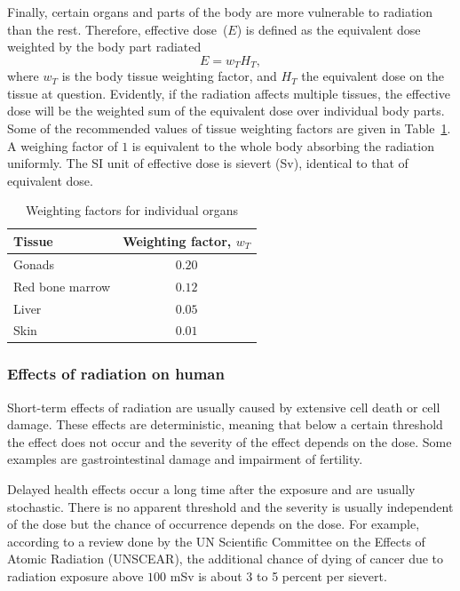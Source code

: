 \documentclass[nofootinbib,preprint,aps]{revtex4-1}
\begin{document}
        Finally, certain organs and parts of the body are more vulnerable to radiation than the rest.
        Therefore, effective dose~($E$) is defined as the equivalent dose weighted by the body part
        radiated
        \begin{equation}
            E = w_T H_T,
        \end{equation}
        where $w_T$ is the body tissue weighting factor, and $H_T$ the equivalent dose on the tissue
        at question.
        Evidently, if the radiation affects multiple tissues, the effective dose will be the weighted
        sum of the equivalent dose over individual body parts. Some of the recommended values of tissue
        weighting factors are given in Table~\ref{tab:eff}. A weighing factor of $1$ is equivalent to the
        whole body absorbing the radiation uniformly. The SI unit of effective dose is sievert (Sv),
        identical to that of equivalent dose.
        \begin{table}
            \centering
            \caption{Weighting factors for individual organs\cite{icrp74}}
            \begin{ruledtabular}
                \begin{tabular}{l c}
                Tissue & Weighting factor, $w_T$\\
                \hline
                Gonads & $0.20$\\
                Red bone marrow & $0.12$ \\
                Liver & $0.05$ \\
                Skin & $0.01$ \\
                \end{tabular}
                \label{tab:eff}
            \end{ruledtabular}
        \end{table}
        \subsubsection{Effects of radiation on human}
        Short-term effects of radiation are usually caused by extensive cell death or cell damage.\cite{u16}
        These effects are deterministic, meaning that below a certain threshold the effect does not occur and
        the severity of the effect depends on the dose. Some examples are gastrointestinal damage and impairment
        of fertility.\cite{u16, l01}

        Delayed health effects occur a long time after the exposure and are usually stochastic. There is
        no apparent threshold and the severity is usually independent of the dose but
        the chance of occurrence depends on the dose.\cite{u16,l01}
        For example, according to a review done by the UN Scientific Committee on the Effects of Atomic Radiation
        (UNSCEAR), the additional chance of dying of cancer due to radiation exposure above $100$ mSv is
        about 3 to 5 percent per sievert.\cite{unscear16}
\end{document}
